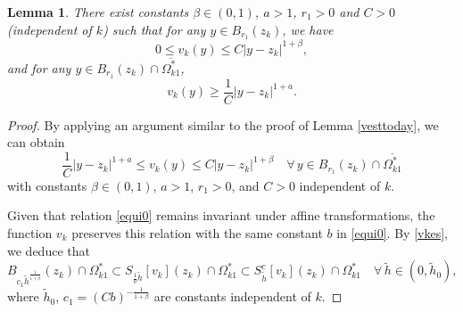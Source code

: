 \documentclass[11pt]{amsart}
\theoremstyle{plain}
\newtheorem{lemma}{Lemma}[section]
\newcommand{\0}{\textbf{0}}
\numberwithin{equation}{section}
\numberwithin{equation}{section}
\numberwithin{figure}{section}
\begin{document}
\begin{lemma}\label{vest1}
  There exist constants \(\beta \in (0, 1)\), \( a>1 \), \(r_1>0\) and \(C > 0\) (independent of \(k\)) such that for any \( y \in B_{r_1}(z_k)\), we have
  \begin{equation}\label{alpha2}
    0 \leq v_k(y) \leq C |y - z_k|^{1 + \beta},
    \end{equation}
 and for any \(y \in B_{r_1}(z_k) \cap \overline{\Omega_{k1}^*}\),
  \begin{equation}\label{beta1}
   v_k(y) \geq \frac{1}{C} |y - z_k|^{1 + a}.
  \end{equation}
\end{lemma}
\begin{proof}
By applying an argument similar to the proof of Lemma \ref{vesttoday}, we can obtain 
	\begin{equation}\label{vkes}
		\frac{1}{C} |y - z_k|^{1 + a} \leq v_k(y) \leq C |y - z_k|^{1 + \beta} \quad \forall\,y \in B_{r_1}(z_k) \cap \overline{\Omega_{k1}^*}
	\end{equation}
with constants \(\beta \in (0, 1)\), \(a > 1\), \(r_1 > 0\), and \(C > 0\) independent of \(k\). 

Given that relation \eqref{equi0} remains invariant under affine transformations, the function \( v_k \) preserves this relation with the same constant \( b \) in \eqref{equi0}. 
By \eqref{vkes}, we deduce that
\begin{equation}\label{ccin2}
B_{c_1\tilde{h}^{\frac{1}{1+\beta}}} (z_k)\cap \Omega^*_{k1} \subset S_{\frac{1}{b}\tilde{h}}[v_k](z_k)\cap\Omega^*_{k1} \subset S^c_{\tilde{h}}[v_k](z_k) \cap \Omega^*_{k1}\quad\forall\,\tilde{h}\in (0, \tilde h_0),
\end{equation}
where $\tilde h_0$, $c_1 = (Cb)^{-\frac{1}{1+\beta}}$ are constants independent of \( k \).


\end{proof}
\end{document}
